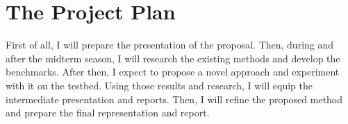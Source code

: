 \documentclass[10pt,twocolumn,letterpaper]{article}
\begin{document}
\section{The Project Plan}
First of all, I will prepare the presentation of the proposal. Then, during and after the midterm season, I will research the existing methods and develop the benchmarks. After then, I expect to propose a novel approach and experiment with it on the testbed. Using those results and research, I will equip the intermediate presentation and reports. Then, I will refine the proposed method and prepare the final representation and report.
 



{\small


}
\end{document}
